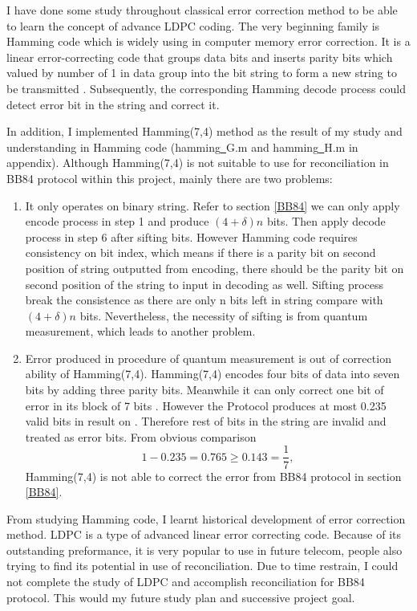 \documentclass[12pt]{article}
\begin{document}
I have done some study throughout classical error correction method to be able to learn the concept of advance LDPC coding. The very beginning family is Hamming code which is widely using in computer memory error correction. It is a linear error-correcting code that groups data bits and inserts parity bits which valued by number of 1 in data group into the bit string to form a new string to be transmitted \cite[p.2]{error2004det}. Subsequently, the corresponding Hamming decode process could detect error bit in the string and correct it.

In addition, I implemented Hamming(7,4) method as the result of my study and understanding in Hamming code (hamming\underline{~}G.m and hamming\underline{~}H.m in appendix). Although Hamming(7,4) is not suitable to use for reconciliation in BB84 protocol within this project, mainly there are two problems:

\begin{enumerate}
\item It only operates on binary string. Refer to section \ref{BB84} we can only apply encode process in step 1 and produce $(4+\delta)n$ bits. Then apply decode process in step 6 after sifting bits. However Hamming code requires consistency on bit index, which means if there is a parity bit on second position of string outputted from encoding, there should be the parity bit on second position of the string to input in decoding as well. Sifting process break the consistence as there are only n bits left in string compare with $(4+\delta)n$ bits. Nevertheless, the necessity of sifting is from quantum measurement, which leads to another problem.
\item Error produced in procedure of quantum measurement is out of correction ability of Hamming(7,4). Hamming(7,4) encodes four bits of data into seven bits by adding three parity bits. Meanwhile it can only correct one bit of error in its block of 7 bits \cite[p.4]{error2004det}. However the Protocol produces at most 0.235 valid bits in result on \pageref{rateplot}. Therefore rest of bits in the string
are invalid and treated as error bits. From obvious comparison
\[
	1-0.235=0.765\geq 0.143 = \frac{1}{7},
\]
Hamming(7,4) is not able to correct the error from BB84 protocol in section \ref{BB84}.
\end{enumerate}
From studying Hamming code, I learnt historical development of error correction method. LDPC is a type of advanced linear error correcting code. Because of its outstanding preformance, it is very popular to use in future telecom, people also trying to find its potential in use of reconciliation. Due to time restrain, I could not complete the study of LDPC and accomplish reconciliation for BB84 protocol. This would my future study plan and successive project goal.
\end{document}
